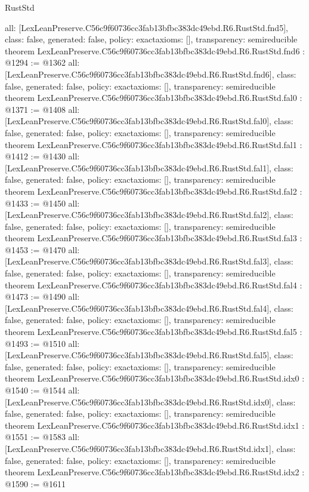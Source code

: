 \begin{lexlean}{RustStd}
\begin{coremodule}
{  all: [LexLeanPreserve.C56c9f60736cc3fab13bfbc383dc49ebd.R6.RustStd.fnd5],
  class: false,
  generated: false,
  policy: exact{axioms: []},
  transparency: semireducible
}
theorem LexLeanPreserve.C56c9f60736cc3fab13bfbc383dc49ebd.R6.RustStd.fnd6 : @1294 := @1362 {
  all: [LexLeanPreserve.C56c9f60736cc3fab13bfbc383dc49ebd.R6.RustStd.fnd6],
  class: false,
  generated: false,
  policy: exact{axioms: []},
  transparency: semireducible
}
theorem LexLeanPreserve.C56c9f60736cc3fab13bfbc383dc49ebd.R6.RustStd.fal0 : @1371 := @1408 {
  all: [LexLeanPreserve.C56c9f60736cc3fab13bfbc383dc49ebd.R6.RustStd.fal0],
  class: false,
  generated: false,
  policy: exact{axioms: []},
  transparency: semireducible
}
theorem LexLeanPreserve.C56c9f60736cc3fab13bfbc383dc49ebd.R6.RustStd.fal1 : @1412 := @1430 {
  all: [LexLeanPreserve.C56c9f60736cc3fab13bfbc383dc49ebd.R6.RustStd.fal1],
  class: false,
  generated: false,
  policy: exact{axioms: []},
  transparency: semireducible
}
theorem LexLeanPreserve.C56c9f60736cc3fab13bfbc383dc49ebd.R6.RustStd.fal2 : @1433 := @1450 {
  all: [LexLeanPreserve.C56c9f60736cc3fab13bfbc383dc49ebd.R6.RustStd.fal2],
  class: false,
  generated: false,
  policy: exact{axioms: []},
  transparency: semireducible
}
theorem LexLeanPreserve.C56c9f60736cc3fab13bfbc383dc49ebd.R6.RustStd.fal3 : @1453 := @1470 {
  all: [LexLeanPreserve.C56c9f60736cc3fab13bfbc383dc49ebd.R6.RustStd.fal3],
  class: false,
  generated: false,
  policy: exact{axioms: []},
  transparency: semireducible
}
theorem LexLeanPreserve.C56c9f60736cc3fab13bfbc383dc49ebd.R6.RustStd.fal4 : @1473 := @1490 {
  all: [LexLeanPreserve.C56c9f60736cc3fab13bfbc383dc49ebd.R6.RustStd.fal4],
  class: false,
  generated: false,
  policy: exact{axioms: []},
  transparency: semireducible
}
theorem LexLeanPreserve.C56c9f60736cc3fab13bfbc383dc49ebd.R6.RustStd.fal5 : @1493 := @1510 {
  all: [LexLeanPreserve.C56c9f60736cc3fab13bfbc383dc49ebd.R6.RustStd.fal5],
  class: false,
  generated: false,
  policy: exact{axioms: []},
  transparency: semireducible
}
theorem LexLeanPreserve.C56c9f60736cc3fab13bfbc383dc49ebd.R6.RustStd.idx0 : @1540 := @1544 {
  all: [LexLeanPreserve.C56c9f60736cc3fab13bfbc383dc49ebd.R6.RustStd.idx0],
  class: false,
  generated: false,
  policy: exact{axioms: []},
  transparency: semireducible
}
theorem LexLeanPreserve.C56c9f60736cc3fab13bfbc383dc49ebd.R6.RustStd.idx1 : @1551 := @1583 {
  all: [LexLeanPreserve.C56c9f60736cc3fab13bfbc383dc49ebd.R6.RustStd.idx1],
  class: false,
  generated: false,
  policy: exact{axioms: []},
  transparency: semireducible
}
theorem LexLeanPreserve.C56c9f60736cc3fab13bfbc383dc49ebd.R6.RustStd.idx2 : @1590 := @1611 {
}
\end{coremodule}
\end{lexlean}
